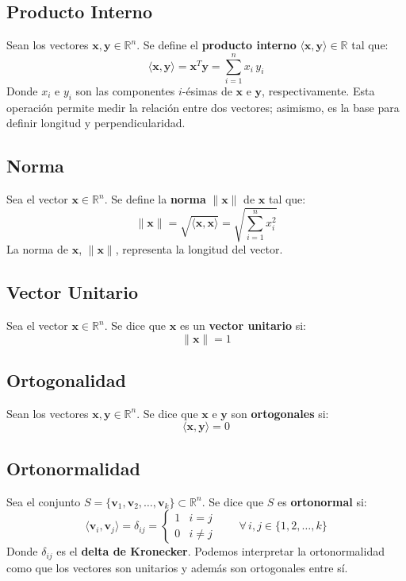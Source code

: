 \subsection{Producto Interno}

Sean los vectores $\mathbf{x}, \mathbf{y} \in \mathbb{R}^n$. Se define el
\textbf{producto interno} $\langle \mathbf{x}, \mathbf{y} \rangle
\in \mathbb{R}$ tal que:
\[
\langle \mathbf{x}, \mathbf{y} \rangle = \mathbf{x}^T\mathbf{y}
= \sum_{i=1}^{n} x_i\,y_i
\]
Donde $x_i$ e $y_i$ son las componentes $i$-ésimas de $\mathbf{x}$ e
$\mathbf{y}$, respectivamente. Esta operación permite medir la relación
entre dos vectores; asimismo, es la base para definir longitud y
perpendicularidad.


\subsection{Norma}

Sea el vector $\mathbf{x} \in \mathbb{R}^n$. Se define la \textbf{norma}
$\|\mathbf{x}\|$ de $\mathbf{x}$ tal que:
\[
\|\mathbf{x}\| = \sqrt{\langle \mathbf{x}, \mathbf{x} \rangle}
= \sqrt{\sum_{i=1}^{n} x_i^2}
\]
La norma de $\mathbf{x}$, $\|\mathbf{x}\|$, representa la longitud del vector.


\subsection{Vector Unitario}

Sea el vector $\mathbf{x} \in \mathbb{R}^n$. Se dice que $\mathbf{x}$ es un
\textbf{vector unitario} si:
\[
\|\mathbf{x}\| = 1
\]


\subsection{Ortogonalidad}

Sean los vectores $\mathbf{x}, \mathbf{y} \in \mathbb{R}^n$. Se dice que
$\mathbf{x}$ e $\mathbf{y}$ son \textbf{ortogonales} si:
\[
\langle \mathbf{x}, \mathbf{y} \rangle = 0
\]


\subsection{Ortonormalidad}

Sea el conjunto $S = \{\mathbf{v}_1, \mathbf{v}_2, \dots, \mathbf{v}_k\}
\subset \mathbb{R}^n$. Se dice que $S$ es \textbf{ortonormal} si:
\[
\langle \mathbf{v}_i, \mathbf{v}_j \rangle = \delta_{ij}
= \begin{cases}
    1 & i = j \\
    0 & i \neq j
\end{cases} \qquad \forall \, i, j \in \{1, 2, \dots, k\}
\]
Donde $\delta_{ij}$ es el \textbf{delta de Kronecker}. Podemos interpretar
la ortonormalidad como que los vectores son unitarios y además son
ortogonales entre sí.


